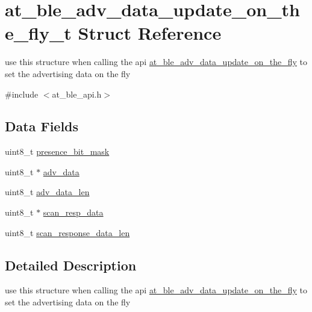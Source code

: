 \hypertarget{structat__ble__adv__data__update__on__the__fly__t}{}\section{at\+\_\+ble\+\_\+adv\+\_\+data\+\_\+update\+\_\+on\+\_\+the\+\_\+fly\+\_\+t Struct Reference}
\label{structat__ble__adv__data__update__on__the__fly__t}


use this structure when calling the api \mbox{\hyperlink{group__gap__adv__group_ga6dbd9fb49cc0fb4feecd09c87ba29518}{at\+\_\+ble\+\_\+adv\+\_\+data\+\_\+update\+\_\+on\+\_\+the\+\_\+fly}} to set the advertising data on the fly  




{\ttfamily \#include $<$at\+\_\+ble\+\_\+api.\+h$>$}

\subsection*{Data Fields}
\begin{DoxyCompactItemize}
\item 
uint8\+\_\+t \mbox{\hyperlink{structat__ble__adv__data__update__on__the__fly__t_a51f5db07c335999b716439f52693153e}{presence\+\_\+bit\+\_\+mask}}
\item 
uint8\+\_\+t $\ast$ \mbox{\hyperlink{structat__ble__adv__data__update__on__the__fly__t_a6f7c4a404361598a270a3811c727d550}{adv\+\_\+data}}
\item 
uint8\+\_\+t \mbox{\hyperlink{structat__ble__adv__data__update__on__the__fly__t_a75fd7fdf06a003b4e9b217d58cd6b077}{adv\+\_\+data\+\_\+len}}
\item 
uint8\+\_\+t $\ast$ \mbox{\hyperlink{structat__ble__adv__data__update__on__the__fly__t_a0e003239e5e63c936174be59bc0ffcfa}{scan\+\_\+resp\+\_\+data}}
\item 
uint8\+\_\+t \mbox{\hyperlink{structat__ble__adv__data__update__on__the__fly__t_aa364778628ff80935bf4515826aae316}{scan\+\_\+response\+\_\+data\+\_\+len}}
\end{DoxyCompactItemize}


\subsection{Detailed Description}
use this structure when calling the api \mbox{\hyperlink{group__gap__adv__group_ga6dbd9fb49cc0fb4feecd09c87ba29518}{at\+\_\+ble\+\_\+adv\+\_\+data\+\_\+update\+\_\+on\+\_\+the\+\_\+fly}} to set the advertising data on the fly 

